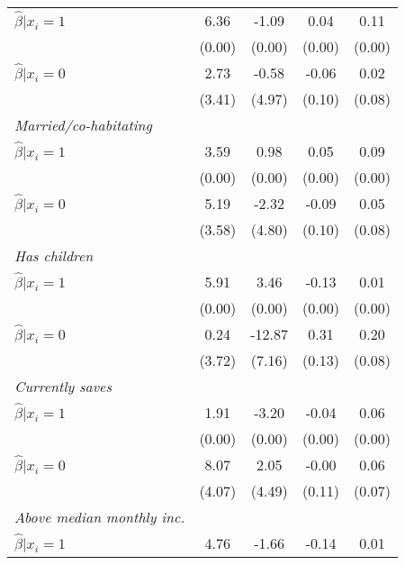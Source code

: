 \begin{table}[h]
{\begin{threeparttable}
\begin{tabular}{l*{4}{c}}
\hspace{0.5cm} \(\hat\beta|x_i=1\)&6.36\sym{*}&    -1.09&     0.04&     0.11\\
                &   (0.00)&   (0.00)&   (0.00)&   (0.00)\\
\hspace{0.5cm} \(\hat\beta|x_i=0\)&     2.73&    -0.58&    -0.06&     0.02\\
                &   (3.41)&   (4.97)&   (0.10)&   (0.08)\\
\textit{Married/co-habitating}&         &         &         &         \\
\hspace{0.5cm} \(\hat\beta|x_i=1\)&     3.59&     0.98&     0.05&     0.09\\
                &   (0.00)&   (0.00)&   (0.00)&   (0.00)\\
\hspace{0.5cm} \(\hat\beta|x_i=0\)&     5.19&    -2.32&    -0.09&     0.05\\
                &   (3.58)&   (4.80)&   (0.10)&   (0.08)\\
\textit{Has children}&         &         &         &         \\
\hspace{0.5cm} \(\hat\beta|x_i=1\)&5.91\sym{*}&     3.46&    -0.13&     0.01\\
                &   (0.00)&   (0.00)&   (0.00)&   (0.00)\\
\hspace{0.5cm} \(\hat\beta|x_i=0\)&     0.24&-12.87\sym{*}&0.31\sym{**}&0.20\sym{**}\\
                &   (3.72)&   (7.16)&   (0.13)&   (0.08)\\
\textit{Currently saves}&         &         &         &         \\
\hspace{0.5cm} \(\hat\beta|x_i=1\)&     1.91&    -3.20&    -0.04&     0.06\\
                &   (0.00)&   (0.00)&   (0.00)&   (0.00)\\
\hspace{0.5cm} \(\hat\beta|x_i=0\)&8.07\sym{**}&     2.05&    -0.00&     0.06\\
                &   (4.07)&   (4.49)&   (0.11)&   (0.07)\\
\textit{Above median monthly inc.}&         &         &         &         \\
\hspace{0.5cm} \(\hat\beta|x_i=1\)&     4.76&    -1.66&    -0.14&     0.01\\

\end{tabular}
\end{threeparttable}}
\end{table}
